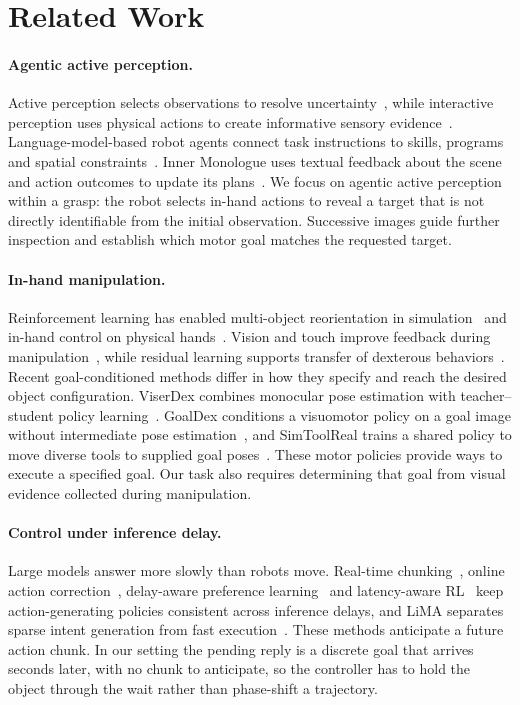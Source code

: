 \section{Related Work}

\paragraph{Agentic active perception.}
Active perception selects observations to resolve uncertainty~\cite{bajcsy1988active}, while interactive perception uses physical actions to create informative sensory evidence~\cite{bohg2017interactive}. Language-model-based robot agents connect task instructions to skills, programs and spatial constraints~\cite{ichter2023saycan,liang2022codepolicies,huang2023voxposer,huang2025rekep}. Inner Monologue uses textual feedback about the scene and action outcomes to update its plans~\cite{huang2023innermonologue}. We focus on agentic active perception within a grasp: the robot selects in-hand actions to reveal a target that is not directly identifiable from the initial observation. Successive images guide further inspection and establish which motor goal matches the requested target.

\paragraph{In-hand manipulation.}
Reinforcement learning has enabled multi-object reorientation in simulation~\cite{chen2022reorientation} and in-hand control on physical hands~\cite{openai2018dexterity,qi2023hora}. Vision and touch improve feedback during manipulation~\cite{qi2023rotateit,yang2025anyrotate}, while residual learning supports transfer of dexterous behaviors~\cite{li2025maniptrans}. Recent goal-conditioned methods differ in how they specify and reach the desired object configuration. ViserDex combines monocular pose estimation with teacher--student policy learning~\cite{bhardwaj2026viserdex}. GoalDex conditions a visuomotor policy on a goal image without intermediate pose estimation~\cite{bhardwaj2026goaldex}, and SimToolReal trains a shared policy to move diverse tools to supplied goal poses~\cite{kedia2026simtoolreal}. These motor policies provide ways to execute a specified goal. Our task also requires determining that goal from visual evidence collected during manipulation.

\paragraph{Control under inference delay.}
Large models answer more slowly than robots move. Real-time chunking~\cite{black2025rtc}, online action correction~\cite{sendai2025a2c2}, delay-aware preference learning~\cite{zhu2026deflect} and latency-aware RL~\cite{zhu2026arli} keep action-generating policies consistent across inference delays, and LiMA separates sparse intent generation from fast execution~\cite{chen2026lima}. These methods anticipate a future action chunk. In our setting the pending reply is a discrete goal that arrives seconds later, with no chunk to anticipate, so the controller has to hold the object through the wait rather than phase-shift a trajectory.
